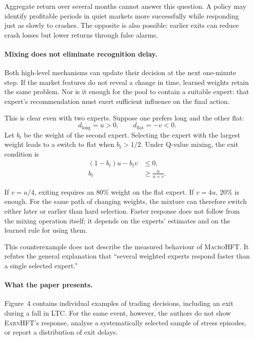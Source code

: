 \documentclass[9pt,a4paper,twocolumn]{extarticle}
\newcommand{\Macro}{\textsc{MacroHFT}}
\newcommand{\Earn}{\textsc{EarnHFT}}
\begin{document}
Aggregate return over several months cannot answer this question. A policy may identify profitable
periods in quiet markets more successfully while responding just as slowly to crashes. The
opposite is also possible: earlier exits can reduce crash losses but lower returns through false
alarms.

\paragraph{Mixing does not eliminate recognition delay.}

Both high-level mechanisms can update their decision at the next one-minute step. If the market
features do not reveal a change in time, learned weights retain the same problem. Nor is it enough
for the pool to contain a suitable expert: that expert's recommendation must exert sufficient
influence on the final action.

This is clear even with two experts. Suppose one prefers long and the other flat:
\[
  d_{\mathrm{long}}=u>0,
  \qquad
  d_{\mathrm{flat}}=-v<0.
\]
Let $b_t$ be the weight of the second expert. Selecting the expert with the largest weight leads
to a switch to flat when $b_t>1/2$. Under Q-value mixing, the exit condition is
\begin{equation}
\begin{aligned}
  (1-b_t)u-b_t v &\leq 0,\\
  b_t &\geq \frac{u}{u+v}.
\end{aligned}
\label{eq:adaptation_threshold}
\end{equation}

If $v=u/4$, exiting requires an 80\% weight on the flat expert. If $v=4u$, 20\% is enough. For
the same path of changing weights, the mixture can therefore switch either later or earlier than
hard selection. Faster response does not follow from the mixing operation itself; it depends on
the experts' estimates and on the learned rule for using them.

This counterexample does not describe the measured behaviour of \Macro{}. It refutes the general
explanation that ``several weighted experts respond faster than a single selected expert.''

\paragraph{What the paper presents.}

Figure~4 contains individual examples of trading decisions, including an exit during a fall in
LTC. For the same event, however, the authors do not show \Earn{}'s response, analyse a
systematically selected sample of stress episodes, or report a distribution of exit delays.
\end{document}
